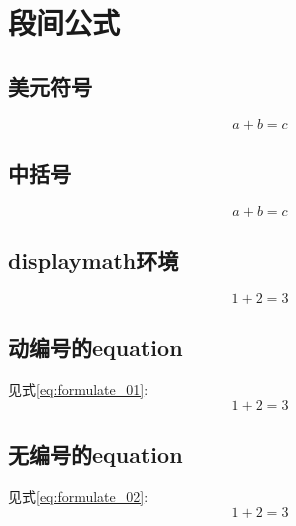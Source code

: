 \documentclass{ctexart}
\begin{document}
	\section{段间公式}
	\subsection{美元符号}
		$$a+b=c$$
	\subsection{中括号}
		\[a + b = c\]
	\subsection{displaymath环境}
		\begin{displaymath}
			1 + 2 = 3
		\end{displaymath}
	\subsection{动编号的equation}
		见式\ref{eq:formulate_01}:
		\begin{equation}
			1 + 2 = 3
			\label{eq:formulate_01}
		\end{equation}
	\subsection{无编号的equation}	%
		见式\ref{eq:formulate_02}:	
		\begin{equation*}
			1 + 2 = 3
			\label{eq:formulate_02}
		\end{equation*}
	
\end{document}

